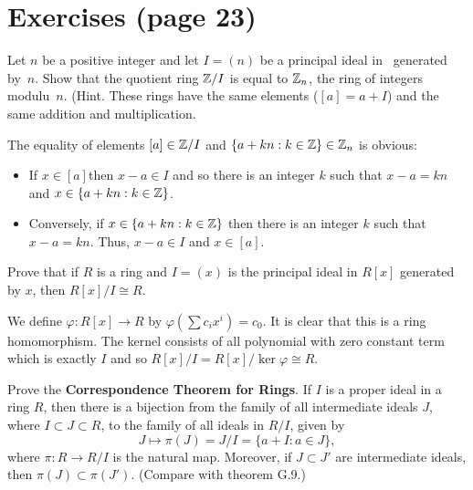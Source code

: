 
\section{Exercises (page 23)}



\begin{myenumerate}


\item
\begin{excopy}
Let $n$ be a positive integer and let \(I=(n)\) be a principal ideal
in \Z\ generated by~$n$. Show that the quotient  ring \(\mathbb{Z}/I\) is equal
to \(\mathbb{Z}_n\), the ring of integers modulu~$n$.
(Hint. These rings have the same elements (\([a]=a+I\))
and the same addition and multiplication.
\end{excopy}

The equality of elements \([a]\in \mathbb{Z}/I\) and \(\{a+kn: k\in \mathbb{Z}\}\in\mathbb{Z}_n\)
is obvious:
\begin{itemize}
 \item
    If \(x\in[a]\)then \(x-a\in I\) and so there is an integer $k$
    such that \(x-a=kn\) and \(x\in \{a+kn: k\in \mathbb{Z}\}\).
 \item
    Conversely, if \(x\in \{a+kn: k\in \mathbb{Z}\}\)
    then there is an integer $k$  such that \(x-a=kn\).
    Thus, \(x-a\in I\) and \(x\in[a]\).

\end{itemize}

\item
\begin{excopy}
Prove that if $R$ is a ring and \(I=(x)\) is the principal ideal in \(R[x]\)
generated by $x$, then \(R[x]/I \cong R\).
\end{excopy}

We define \(\varphi:R[x] \rightarrow R\)
by \(\varphi(\sum c_ix^i)=c_0\).
It is clear that this is a ring homomorphism.
The kernel consists of all polynomial with zero constant term
which is exactly $I$ and so \(R[x]/I = R[x]/\ker\varphi \cong R\).

\item
\begin{excopy}
Prove the
\textbf{Correspondence Theorem for Rings}.
If $I$ is a proper ideal in a ring $R$, then there is a bijection
from the family of all intermediate ideals $J$, where
\(I\subset J\subset R\), to the family of all ideals in \(R/I\), given by
 \[J\mapsto \pi(J) = J/I = \{a+I: a\in J\}, \]
where \(\pi :R \rightarrow R/I\) is the natural map.
Moreover, if \(J\subset J'\) are intermediate ideals, then
\(\pi(J)\subset \pi(J')\). (Compare with theorem G.9.)
\end{excopy}


\end{myenumerate}
